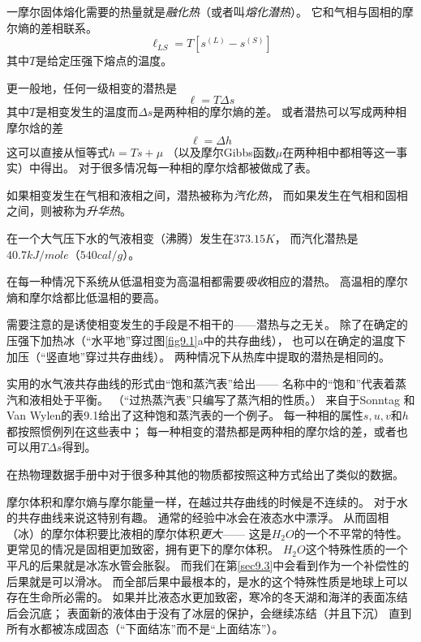 一摩尔固体熔化需要的热量就是{\it 融化热}（或者叫{\it 熔化潜热}）。
它和气相与固相的摩尔熵的差相联系。
\begin{equation}
\label{equ9.1}
\ell_{LS}=T[s^{(L)}-s^{(S)}]
\end{equation}
其中$T$是给定压强下熔点的温度。

更一般地，任何一级相变的潜热是
\begin{equation}
\label{equ9.2}
\ell=T\Delta s
\end{equation}
其中$T$是相变发生的温度而$\Delta s$是两种相的摩尔熵的差。
或者潜热可以写成两种相摩尔焓的差
\begin{equation}
\label{equ9.3}
\ell=\Delta h
\end{equation}
这可以直接从恒等式$h=Ts+\mu$
（以及摩尔Gibbs函数$\mu$在两种相中都相等这一事实）中得出。
对于很多情况每一种相的摩尔焓都被做成了表。

如果相变发生在气相和液相之间，潜热被称为{\it 汽化热}，
而如果发生在气相和固相之间，则被称为{\it 升华热}。

在一个大气压下水的气液相变（沸腾）发生在$373.15K$，
而汽化潜热是$40.7kJ/mole$（$540cal/g$）。

在每一种情况下系统从低温相变为高温相都需要{\it 吸收}相应的潜热。
高温相的摩尔熵和摩尔焓都比低温相的要高。

需要注意的是诱使相变发生的手段是不相干的——潜热与之无关。
除了在确定的压强下加热冰（“水平地”穿过图\ref{fig9.1}a中的共存曲线），
也可以在确定的温度下加压（“竖直地”穿过共存曲线）。
两种情况下从热库中提取的潜热是相同的。

实用的水气液共存曲线的形式由“饱和蒸汽表”给出——
名称中的“饱和”代表着蒸汽和液相处于平衡。
（“过热蒸汽表”只编写了蒸汽相的性质。）
来自于Sonntag 和Van Wylen的表9.1给出了这种饱和蒸汽表的一个例子。
每一种相的属性$s,u,v$和$h$都按照惯例列在这些表中；
每一种相变的潜热都是两种相的摩尔焓的差，或者也可以用$T\Delta s$得到。

在热物理数据手册中对于很多种其他的物质都按照这种方式给出了类似的数据。

摩尔体积和摩尔熵与摩尔能量一样，在越过共存曲线的时候是不连续的。
对于水的共存曲线来说这特别有趣。
通常的经验中冰会在液态水中漂浮。
从而固相（冰）的摩尔体积要比液相的摩尔体积{\it 更大}——
这是$H_2O$的一个不平常的特性。
更常见的情况是固相更加致密，拥有更下的摩尔体积。
$H_2O$这个特殊性质的一个平凡的后果就是冰冻水管会胀裂。
而我们在第\ref{sec9.3}中会看到作为一个补偿性的后果就是可以滑冰。
而全部后果中最根本的，是水的这个特殊性质是地球上可以存在生命所必需的。
如果并比液态水更加致密，寒冷的冬天湖和海洋的表面冻结后会沉底；
表面新的液体由于没有了冰层的保护，会继续冻结（并且下沉）
直到所有水都被冻成固态（“下面结冻”而不是“上面结冻”）。

